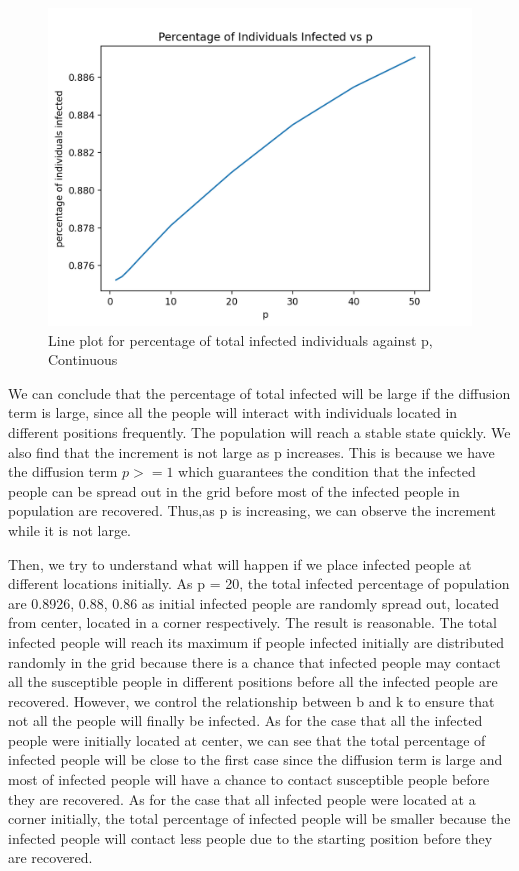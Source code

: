 \documentclass{article}
\begin{document}
\begin{figure}[htp]
\centering
\includegraphics[width=.3\textwidth]{odeplot.png}
\caption{Line plot for percentage of total infected individuals against p, Continuous}
\label{fig:figure4}
\end{figure}
\FloatBarrier



 We can conclude that the percentage of total infected will be large if the diffusion term is large, since all the people will interact with individuals located in different positions frequently. The population will reach a stable state quickly. We also find that the increment is not large as p increases. This is because we have the diffusion term $p > =1$ which guarantees the condition that the infected people can be spread out in the grid before most of the infected people in population are recovered. Thus,as p is increasing, we can observe the increment while it is not large.



Then, we try to understand what will happen if we place infected people at different locations initially. As p = 20, the total infected percentage of population are 0.8926, 0.88, 0.86 as initial infected people are randomly spread out, located from center, located in a corner respectively. The result is reasonable. The total infected people will reach its maximum if people infected initially are distributed randomly in the grid because there is a chance that infected people may contact all the susceptible people in different positions before all the infected people are recovered. However, we control the relationship between b and k to ensure that not all the people will finally be infected. As for the case that all the infected people were initially located at center, we can see that the total percentage of infected people will be close to the first case since the diffusion term is large and most of infected people will have a chance to contact susceptible people before they are recovered. As for the case that all infected people were located at a corner initially, the total percentage of infected people will be smaller because the infected people will contact less people due to the starting position before they are recovered.
\end{document}
